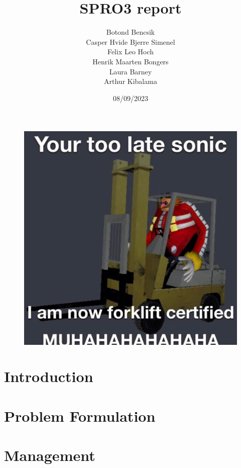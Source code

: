 \documentclass[11pt,table]{article}
\title{SPRO3 report}
\date{08/09/2023}
\author{Botond Bencsik\\Casper Hvide Bjerre Simenel\\Felix Leo Hoch\\Henrik Maarten Bongers\\Laura Barney\\Arthur Kibalama}
\begin{document}
\maketitle
\begin{figure}[H]
    \includegraphics[width=\textwidth]{forklift_m.jpg}
\end{figure}
\newpage

\tableofcontents
\newpage
\section{Introduction}
      
\section{Problem Formulation}
    
    
    

    
\section{Management}
    
    
\end{document}
